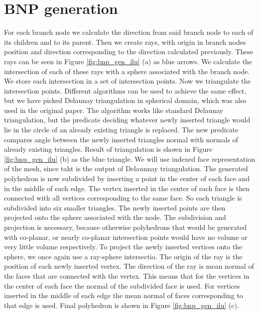 \section{BNP generation}\label{sec:bnp_gen}
For each branch node we calculate the direction from said branch node to each of its children and to its parent. Then we create rays, with origin in branch nodes position and direction corresponding to the direction calculated previously. These rays can be seen in Figure \ref{fig:bnp_gen_ilu} (a) as blue arrows. We calculate the intersection of each of these rays with a sphere associated with the branch node. We store each intersection in a set of intersection points. Now we triangulate the intersection points. Different algorithms can be used to achieve the same effect, but we have picked Delaunay triangulation in spherical domain, which was also used in the original paper. The algorithm works like standard Delaunay triangulation, but the predicate deciding whatever newly inserted triangle would lie in the circle of an already existing triangle is replaced. The new predicate compares angle between the newly inserted triangles normal with normals of already existing triangles. Result of triangulation is shown in Figure \ref{fig:bnp_gen_ilu} (b) as the blue triangle. We will use indexed face representation of the mesh, since taht is the output of Delaunnay triangulation. The generated polyhedron is now subdivided by inserting a point in the center of each face and in the middle of each edge. The vertex inserted in the center of each face is then connected with all vertices corresponding to the same face. So each triangle is subdivided into six smaller triangles. The newly inserted points are then projected onto the sphere associated with the node. The subdivision and projection is necessary, because otherwise polyhedrons that would be generated with co-planar, or nearly co-planar intersection points would have no volume or very little volume respectively. To project the newly inserted vertices onto the sphere, we once again use a ray-sphere intersectio. The origin of the ray is the position of each newly inserted vertex. The direction of the ray is mean normal of the faces that are connected with the vertex. This means that for the vertices in the center of each face the normal of the subdivided face is used. For vertices inserted in the middle of each edge the mean normal of faces corresponding to that edge is used. Final polyhedron is shown in Figure \ref{fig:bnp_gen_ilu} (c).

